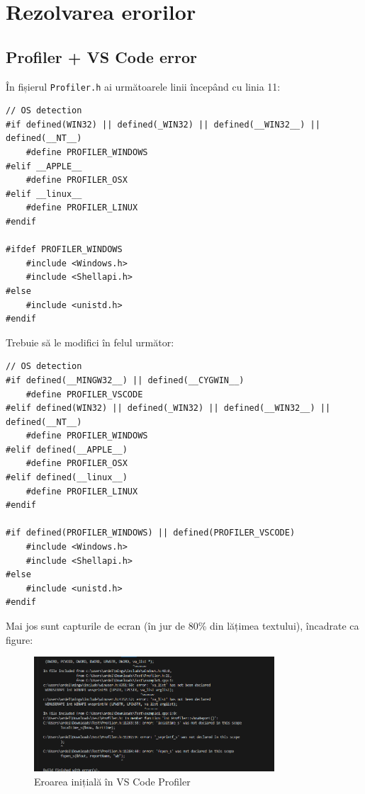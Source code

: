 \documentclass[../ro-fa-lab.tex]{subfiles}
\begin{document}
\section{\textbf{Rezolvarea erorilor}}\label{errors}

\subsection{Profiler + VS Code error}\label{profiler-vscode-error}

În fișierul \texttt{Profiler.h} ai următoarele linii începând cu linia 11:

\begin{lstlisting}
// OS detection
#if defined(WIN32) || defined(_WIN32) || defined(__WIN32__) || defined(__NT__)
    #define PROFILER_WINDOWS
#elif __APPLE__
    #define PROFILER_OSX
#elif __linux__
    #define PROFILER_LINUX
#endif

#ifdef PROFILER_WINDOWS
    #include <Windows.h>
    #include <Shellapi.h>
#else
    #include <unistd.h>
#endif
\end{lstlisting}

Trebuie să le modifici în felul următor:

\begin{lstlisting}
// OS detection
#if defined(__MINGW32__) || defined(__CYGWIN__)
    #define PROFILER_VSCODE
#elif defined(WIN32) || defined(_WIN32) || defined(__WIN32__) || defined(__NT__)
    #define PROFILER_WINDOWS
#elif defined(__APPLE__)
    #define PROFILER_OSX
#elif defined(__linux__)
    #define PROFILER_LINUX
#endif

#if defined(PROFILER_WINDOWS) || defined(PROFILER_VSCODE)
    #include <Windows.h>
    #include <Shellapi.h>
#else
    #include <unistd.h>
#endif
\end{lstlisting}

Mai jos sunt capturile de ecran (în jur de 80\% din lățimea textului), încadrate ca figure:

\begin{figure}[htbp]
    \centering
    \includegraphics[width=0.8\textwidth]{./Resources/error_fix/image1.png}
    \caption{Eroarea inițială în VS Code Profiler}
    \label{fig:error1}
\end{figure}
\end{document}
